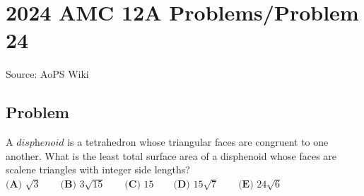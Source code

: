 \documentclass[12pt]{article}
\begin{document}
\section*{{2024 AMC 12A Problems/Problem 24}}
Source: AoPS Wiki

\subsection*{Problem}
A $\textit{disphenoid}$ is a tetrahedron whose triangular faces are congruent to one another. What is the least total surface area of a disphenoid whose faces are scalene triangles with integer side lengths? $\textbf{(A) }\sqrt{3}\qquad\textbf{(B) }3\sqrt{15}\qquad\textbf{(C) }15\qquad\textbf{(D) }15\sqrt{7}\qquad\textbf{(E) }24\sqrt{6}$
\end{document}
